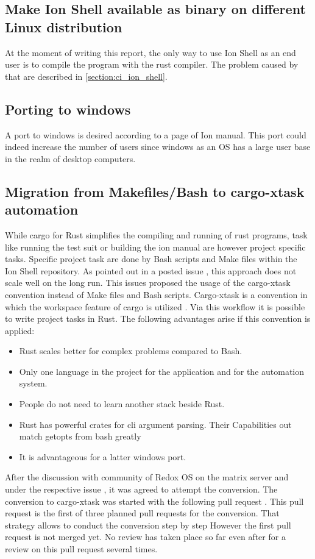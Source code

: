 \subsection{Make Ion Shell available as binary on different Linux distribution}

At the moment of writing this report,
the only way to use Ion Shell as an end user is to compile the program with the rust compiler.
The problem caused by that are described in \ref{section:ci_ion_shell}.

\subsection{Porting to windows}

A port to windows is desired \cite{ion_manual_instroduction} according to a page of Ion manual.
This port could indeed increase the number of users since windows
as an OS has a large user base in the realm of desktop computers.

\subsection{Migration from Makefiles/Bash to cargo-xtask automation}

While cargo for Rust simplifies the compiling and running of rust programs,
task like running the test suit or building the ion manual are however project specific tasks.
Specific project task are done by Bash scripts and Make files within the Ion Shell repository.
As pointed out in a posted issue \cite{issue_convert_make_files_to_xtask},
this approach does not scale well on the long run.
This issues proposed the usage of the cargo-xtask convention instead of Make files and Bash scripts.
Cargo-xtask is a convention in which the workspace feature of cargo is utilized \cite{repos_cargo_xtask}.
Via this workflow it is possible to write project tasks in Rust.
The following advantages arise if this convention is applied:
\begin{itemize}
	\item Rust scales better for complex problems compared to Bash.
	\item Only one language in the project for the application and for the automation system.
	\item People do not need to learn another stack beside Rust.
	\item Rust has powerful crates for cli argument parsing. Their Capabilities out match getopts from bash greatly
	\item It is advantageous for a latter windows port.
\end{itemize}

After the discussion with community of Redox OS on the matrix server and under the respective issue
\cite{issue_convert_make_files_to_xtask}, it was agreed to attempt the conversion.
The conversion to cargo-xtask was started with the following pull request \cite{pr_still_opened_cargo_xtask}.
This pull request is the first of three planned pull requests for the conversion.
That strategy allows to conduct the conversion step by step
However the first pull request is not merged yet.
No review has taken place so far even after for a review on this pull request several times.


